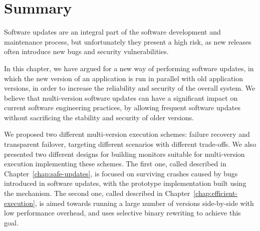 \section{Summary}
\label{multi-version:summary}

Software updates are an integral part of the software development and
maintenance process, but unfortunately they present a high risk, as new
releases often introduce new bugs and security vulnerabilities.

In this chapter, we have argued for a new way of performing software updates,
in which the new version of an application is run in parallel with old
application versions, in order to increase the reliability and security of the
overall system. We believe that multi-version software updates can have a
significant impact on current software engineering practices, by allowing
frequent software updates without sacrificing the stability and security of
older versions.

We proposed two different multi-version execution schemes: failure recovery and
transparent failover, targeting different scenarios with different trade-offs.
We also presented two different designs for building monitors suitable for
multi-version execution implementing these schemes. The first one, called \mx
described in Chapter~\ref{chap:safe-updates}, is focused on surviving crashes
caused by bugs introduced in software updates, with the prototype
implementation built using the \ptrace mechanism. The second one, called \varan
described in Chapter~\ref{chap:efficient-execution}, is aimed towards running a
large number of versions side-by-side with low performance overhead, and uses
selective binary rewriting to achieve this goal. 
